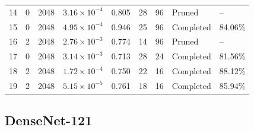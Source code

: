 {\begin{longtable}{lccccccll}
14 & 0 & 2048 & $3.16\times10^{-4}$ & 0.805 & 28 & 96 & Pruned & -- \\
15 & 0 & 2048 & $4.95\times10^{-4}$ & 0.946 & 25 & 96 & Completed & 84.06\% \\
16 & 2 & 2048 & $2.76\times10^{-3}$ & 0.774 & 14 & 96 & Pruned & -- \\
17 & 0 & 2048 & $3.14\times10^{-3}$ & 0.713 & 28 & 24 & Completed & 81.56\% \\
\rowcolor{gray!15} 18 & 2 & 2048 & $1.72\times10^{-4}$ & 0.750 & 22 & 16 & Completed & 88.12\% \\
19 & 2 & 2048 & $5.15\times10^{-5}$ & 0.761 & 18 & 16 & Completed & 85.94\% \\
\end{longtable}
}

\Needspace*{0.6\textheight}
\subsection{DenseNet-121}

